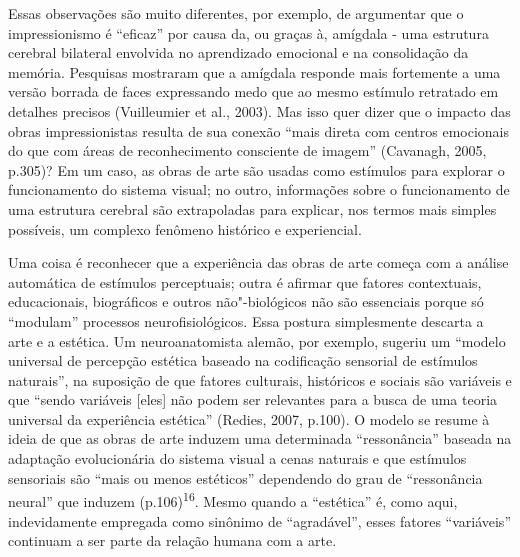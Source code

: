 Essas observações são muito diferentes, por exemplo, de argumentar que o
impressionismo é ``eficaz'' por causa da, ou graças à, amígdala - uma
estrutura cerebral bilateral envolvida no aprendizado emocional e na
consolidação da memória. Pesquisas mostraram que a amígdala responde
mais fortemente a uma versão borrada de faces expressando medo que ao
mesmo estímulo retratado em detalhes precisos (Vuilleumier et al.,
2003). Mas isso quer dizer que o impacto das obras impressionistas
resulta de sua conexão ``mais direta com centros emocionais do que com
áreas de reconhecimento consciente de imagem'' (Cavanagh, 2005, p.305)?
Em um caso, as obras de arte são usadas como estímulos para explorar o
funcionamento do sistema visual; no outro, informações sobre o
funcionamento de uma estrutura cerebral são extrapoladas para explicar,
nos termos mais simples possíveis, um complexo fenômeno histórico e
experiencial.

Uma coisa é reconhecer que a experiência das obras de arte começa com a
análise automática de estímulos perceptuais; outra é afirmar que fatores
contextuais, educacionais, biográficos e outros não"-biológicos não são
essenciais porque só ``modulam'' processos neurofisiológicos. Essa
postura simplesmente descarta a arte e a estética. Um neuroanatomista
alemão, por exemplo, sugeriu um ``modelo universal de percepção estética
baseado na codificação sensorial de estímulos naturais'', na suposição
de que fatores culturais, históricos e sociais são variáveis e que
``sendo variáveis {[}eles{]} não podem ser relevantes para a busca de
uma teoria universal da experiência estética'' (Redies, 2007, p.100). O
modelo se resume à ideia de que as obras de arte induzem uma determinada
``ressonância'' baseada na adaptação evolucionária do sistema visual a
cenas naturais e que estímulos sensoriais são ``mais ou menos
estéticos'' dependendo do grau de ``ressonância neural'' que induzem
(p.106)\textsuperscript{16}. Mesmo quando a ``estética'' é, como aqui,
indevidamente empregada como sinônimo de ``agradável'', esses fatores
``variáveis'' continuam a ser parte da relação humana com a arte.

